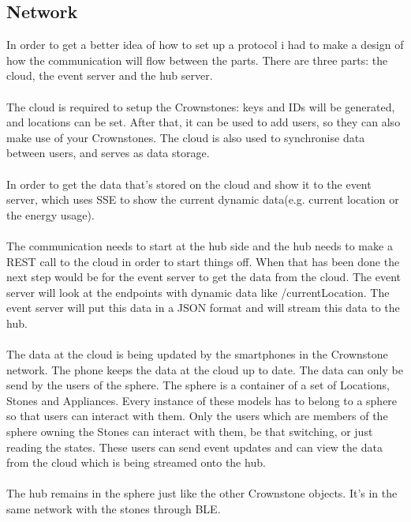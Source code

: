 \documentclass{article}
\begin{document}
\subsection{Network}\label{sec:network} 
In order to get a better idea of how to set up a protocol i had to make a design of how the communication will flow between the parts. There are three parts: the cloud, the event server and the hub server. \\
\\
The cloud is required to setup the Crownstones: keys and IDs will be generated, and locations can be set. After that, it can be used to add users, so they can also make use of your Crownstones. The cloud is also used to synchronise data between users, and serves as data storage.\\
\\
In order to get the data that's stored on the cloud and show it to the event server, which uses SSE to show the current dynamic data(e.g. current location or the energy usage).\\
 \\
The communication needs to start at the hub side and the hub needs to make a REST call to the cloud in order to start things off. When that has been done the next step would be for the event server to get the data from the cloud. The event server will look at the endpoints with dynamic data like /currentLocation. The event server will put this data in a JSON format and will stream this data to the hub.\\
\\
The data at the cloud is being updated by the smartphones in the Crownstone network. The phone keeps the data at the cloud up to date.  The  data can only be send by the users of the sphere. The sphere is a container of a set of Locations, Stones and Appliances. Every instance of these models has to belong to a sphere so that users can interact with them. Only the users which are members of the sphere owning the Stones can interact with them, be that switching, or just reading the states. These users can send event updates and can view the data from the cloud which is being streamed onto the hub.\\
\\
The hub remains in the sphere just like the other Crownstone objects. It's in the same network with the stones through BLE. 
\end{document}
